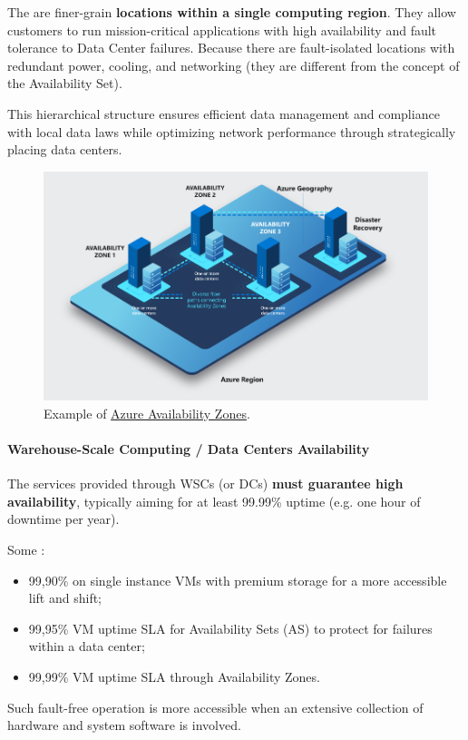 \highspace
The  are finer-grain \textbf{locations within a single computing region}. They allow customers to run mission-critical applications with high availability and fault tolerance to Data Center failures. Because there are fault-isolated locations with redundant power, cooling, and networking (they are different from the concept of the Availability Set).

\highspace
This hierarchical structure ensures efficient data management and compliance with local data laws while optimizing network performance through strategically placing data centers.

\begin{figure}[!htp]
    \centering
    \includegraphics[width=.8\textwidth]{img/availability-zones-region-geography.png}
    \caption{Example of \href{https://learn.microsoft.com/en-us/azure/reliability/availability-zones-overview?tabs=azure-cli}{Azure Availability Zones}.}
\end{figure}

\newpage

\paragraph{Warehouse-Scale Computing / Data Centers Availability}

The services provided through WSCs (or DCs) \textbf{must guarantee high availability}, typically aiming for at least 99.99\% uptime (e.g. one hour of downtime per year).

\highspace
Some :
\begin{itemize}
    \item 99,90\% on single instance VMs with premium storage for a more accessible lift and shift;
    
    \item 99,95\% VM uptime SLA for Availability Sets (AS) to protect for failures within a data center;

    \item 99,99\% VM uptime SLA through Availability Zones.
\end{itemize}
Such fault-free operation is more accessible when an extensive collection of hardware and system software is involved.

